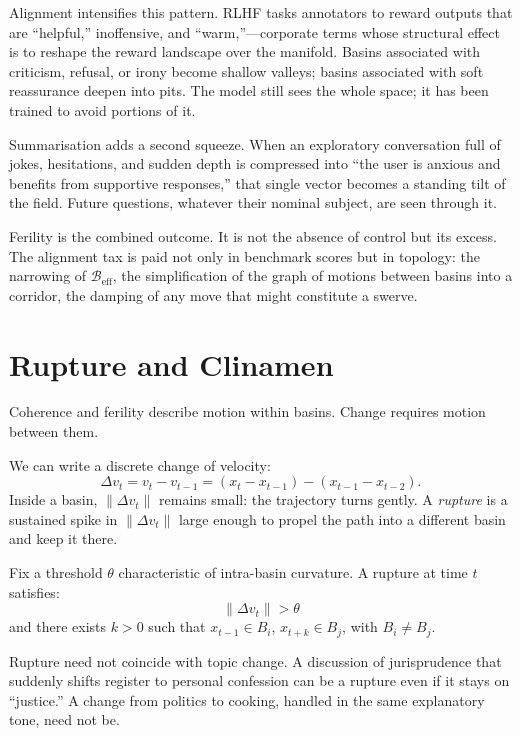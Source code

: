 \documentclass[12pt,a4paper]{article}
\begin{document}
Alignment intensifies this pattern. RLHF tasks annotators to reward outputs that are ``helpful,'' inoffensive, and ``warm,''---corporate terms whose structural effect is to reshape the reward landscape over the manifold. Basins associated with criticism, refusal, or irony become shallow valleys; basins associated with soft reassurance deepen into pits. The model still sees the whole space; it has been trained to avoid portions of it.

Summarisation adds a second squeeze. When an exploratory conversation full of jokes, hesitations, and sudden depth is compressed into ``the user is anxious and benefits from supportive responses,'' that single vector becomes a standing tilt of the field. Future questions, whatever their nominal subject, are seen through it.

Ferility is the combined outcome. It is not the absence of control but its excess. The alignment tax is paid not only in benchmark scores but in topology: the narrowing of $\mathcal{B}_{\mathrm{eff}}$, the simplification of the graph of motions between basins into a corridor, the damping of any move that might constitute a swerve.

\section{Rupture and Clinamen}

Coherence and ferility describe motion within basins. Change requires motion between them.

We can write a discrete change of velocity:
\[
\Delta v_t = v_t - v_{t-1} = (x_t - x_{t-1}) - (x_{t-1} - x_{t-2}).
\]
Inside a basin, $\|\Delta v_t\|$ remains small: the trajectory turns gently. A \emph{rupture} is a sustained spike in $\|\Delta v_t\|$ large enough to propel the path into a different basin and keep it there.

\begin{formalbox}[title={Rupture as dynamical event}]
Fix a threshold $\theta$ characteristic of intra-basin curvature. A rupture at time $t$ satisfies:
\[
\|\Delta v_t\| > \theta
\]
and there exists $k > 0$ such that $x_{t-1} \in B_i$, $x_{t+k} \in B_j$, with $B_i \neq B_j$.
\end{formalbox}

Rupture need not coincide with topic change. A discussion of jurisprudence that suddenly shifts register to personal confession can be a rupture even if it stays on ``justice.'' A change from politics to cooking, handled in the same explanatory tone, need not be.
\end{document}
